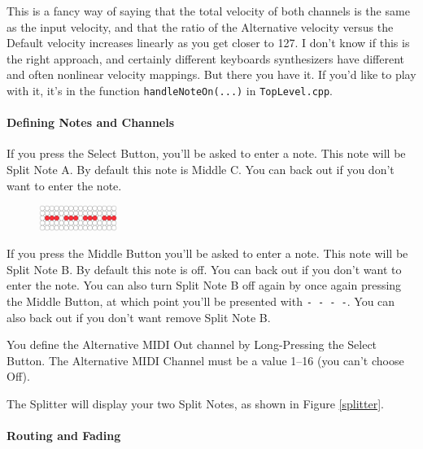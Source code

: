 \documentclass{article}
\begin{document}
This is a fancy way of saying that the total velocity of both channels is the same as the input velocity, and that the ratio of the Alternative velocity versus the Default velocity increases linearly as you get closer to 127.  I don't know if this is the right approach, and certainly different keyboards synthesizers have different and often nonlinear velocity mappings.  But there you have it.  If you'd like to play with it, it's in the function \texttt{handleNoteOn(...)} in \texttt{TopLevel.cpp}.

\paragraph{Defining Notes and Channels}

If you press the Select Button, you'll be asked to enter a note.  This note will be Split Note A.  By default this note is Middle C.  You can back out if you don't want to enter the note.

\begin{figure}
\vspace{-1em}\includegraphics[width=1in]{none}
\vspace{-2em}
\end{figure}

If you press the Middle Button you'll be asked to enter a note.  This note will be Split Note B.  By default this note is off.  You can back out if you don't want to enter the note.  You can also turn Split Note B off again by once again pressing the Middle Button, at which point you'll be presented with \texttt{-~-~-~-}.  You can also back out if you don't want remove Split Note B.

You define the Alternative MIDI Out channel by Long-Pressing the Select Button.  The Alternative MIDI Channel must be a value 1--16 (you can't choose Off).

The Splitter will display your two Split Notes, as shown in Figure \ref{splitter}.

\paragraph{Routing and Fading}
\end{document}
